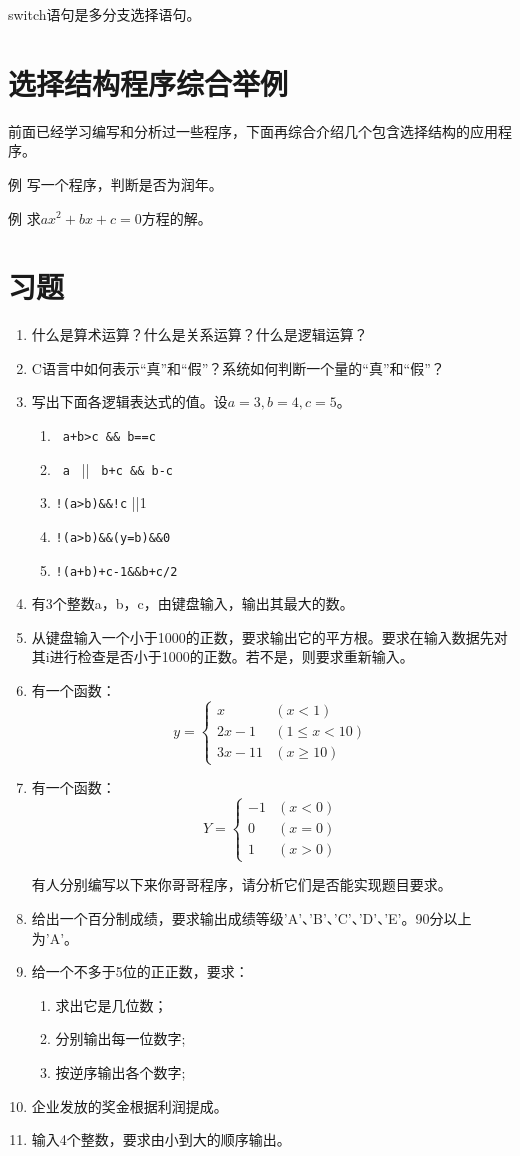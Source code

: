 switch语句是多分支选择语句。
\section{选择结构程序综合举例}
前面已经学习编写和分析过一些程序，下面再综合介绍几个包含选择结构的应用程序。

例 写一个程序，判断是否为润年。

例 求$ax^2 + bx + c = 0$方程的解。
\section{习题}
\begin{enumerate}
	\item 什么是算术运算？什么是关系运算？什么是逻辑运算？
	\item C语言中如何表示“真”和“假”？系统如何判断一个量的“真”和“假”？
	\item 写出下面各逻辑表达式的值。设$a=3,b=4,c=5$。
		\begin{enumerate}
			\item \verb| a+b>c && b==c|
			\item \verb| a | || \verb| b+c && b-c| 
			\item \verb|!(a>b)&&!c| ||1 
			\item \verb|!(a>b)&&(y=b)&&0|
			\item \verb|!(a+b)+c-1&&b+c/2|
		\end{enumerate}
	\item 有3个整数a，b，c，由键盘输入，输出其最大的数。
	\item 从键盘输入一个小于1000的正数，要求输出它的平方根。要求在输入数据先对其i进行检查是否小于1000的正数。若不是，则要求重新输入。
	\item 有一个函数：
		\begin{equation} y = 
				\begin{cases}
					x & (x < 1) \\
					2x -1 & (1 \leqslant x < 10) \\
					3x - 11 & (x \geqslant 10) 
				\end{cases}
		\end{equation}
	\item 有一个函数：
		\begin{equation} Y = 
			\begin{cases}
				-1	&	(x < 0)	\\
				0	&	(x = 0)	\\
				1	&	(x > 0)
			\end{cases}
		\end{equation}

		有人分别编写以下来你哥哥程序，请分析它们是否能实现题目要求。
	\item 给出一个百分制成绩，要求输出成绩等级'A'、'B'、'C'、'D'、'E'。90分以上为'A'。
	\item 给一个不多于5位的正正数，要求：
		\begin{enumerate}
			\item 求出它是几位数；
			\item 分别输出每一位数字;
			\item 按逆序输出各个数字;
		\end{enumerate}
	\item 企业发放的奖金根据利润提成。
	\item 输入4个整数，要求由小到大的顺序输出。
\end{enumerate}
